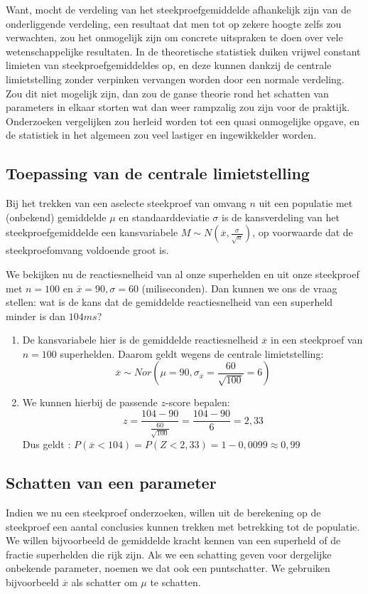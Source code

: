{Want, mocht de verdeling van het steekproefgemiddelde afhankelijk zijn van de onderliggende verdeling, een resultaat dat men tot op zekere hoogte zelfs zou verwachten, zou het onmogelijk zijn om concrete uitspraken te doen over vele wetenschappelijke resultaten. In de theoretische statistiek duiken vrijwel constant limieten van steekproefgemiddeldes op, en deze kunnen dankzij de centrale limietstelling zonder verpinken vervangen worden door een normale verdeling. Zou dit niet mogelijk zijn, dan zou de ganse theorie rond het schatten van parameters in elkaar storten wat dan weer rampzalig zou zijn voor de praktijk. Onderzoeken vergelijken zou herleid worden tot een quasi onmogelijke opgave, en de statistiek in het algemeen zou veel lastiger en ingewikkelder worden.

\subsection{Toepassing van de centrale limietstelling}
Bij het trekken van een aselecte steekproef van omvang $n$ uit een populatie met (onbekend) gemiddelde $\mu$ en standaarddeviatie $\sigma$ is de kansverdeling van het steekproefgemiddelde een kansvariabele $M \sim N (\overline{x}, \frac{\sigma}{\sqrt{n}})$, op voorwaarde dat de steekproefomvang voldoende groot is.

\begin{example}
  We bekijken nu de reactiesnelheid van al onze superhelden en uit onze steekproef met $n = 100$ en $\overline{x} = 90, \sigma = 60$ (miliseconden). Dan kunnen we ons de vraag stellen: wat is de kans dat de gemiddelde reactiesnelheid van een superheld minder is dan $104 ms$?


  \begin{enumerate}
    \item De kansvariabele hier is de gemiddelde reactiesnelheid $\overline{x}$ in een steekproef van $n=100$ superhelden. Daarom geldt wegens de centrale limietstelling:
    \[ \overline{x} \sim Nor(\mu = 90, \sigma_{\overline{x}} = \frac{60}{\sqrt{100}} = 6) \]
    \item We kunnen hierbij de passende $z$-score bepalen:
    \[ z = \frac{104-90}{\frac{60}{\sqrt{100}}} = \frac{104-90}{6} = 2,33 \]
    Dus geldt : $P(\overline{x} < 104) = P(Z < 2,33) = 1 - 0,0099 \approx 0,99$
  \end{enumerate}
\end{example}

\subsection{Schatten van een parameter}
Indien we nu een steekproef onderzoeken, willen uit de berekening op de steekproef een aantal conclusies kunnen trekken met betrekking tot de populatie. We willen bijvoorbeeld de gemiddelde kracht kennen van een superheld of de fractie superhelden die rijk zijn. Als we een schatting geven voor dergelijke onbekende parameter, noemen we dat ook een puntschatter. We gebruiken bijvoorbeeld $\overline{x}$ als schatter om $\mu$ te schatten.

}
